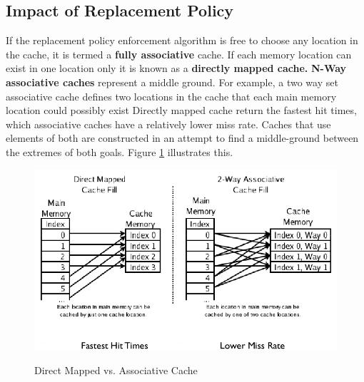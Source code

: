 \documentclass[10pt,a4paper]{article}
\begin{document}
\subsection{Impact of Replacement Policy}
If the replacement policy enforcement algorithm is free to choose any location in the cache, it is termed a \textbf{fully associative} cache. If each memory location can exist in one location only it is known as a \textbf{directly mapped cache.} \textbf{N-Way associative caches} represent a middle ground. For example, a two way set associative cache defines two locations in the cache that each main memory location could possibly exist\newline\newline
Directly mapped cache return the fastest hit times, which associative caches have a relatively lower miss rate. Caches that use elements of both are constructed in an attempt to find a middle-ground between the extremes of both goals. Figure \ref{cache} illustrates this. 
\begin{figure}
\caption{Direct Mapped vs. Associative Cache \cite{CACHE}}
\begin{center}
\includegraphics[scale=0.45]{../images/cache.png}
\label{cache}
\end{center}
\end{figure}
{}

\begin{center}
\end{center}
\end{document}
